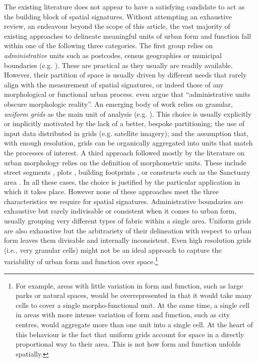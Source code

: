 The existing literature does not appear to have a satisfying candidate to act as
the building block of spatial signatures.
%
Without attempting an exhaustive review, an endeavour beyond the scope of this
article, the vast majority of existing approaches to delineate meaningful units
of urban form and function fall within one of the following three categories.
The first group relies on \textit{administrative} units such as postcodes,
census geographies or municipal boundaries (e.g. \citealp{taubenbock2020}).
%
These are practical as they usually are readily
available. However, their partition of space is usually driven by different
needs that rarely align with the measurement of spatial signatures, or indeed
those of any morphological or functional urban process.
\cite{taubenbock2019new} even argue that
``administrative units obscure morphologic reality''.
An emerging body of work relies on granular, \textit{uniform grids} as the main
unit of analysis (e.g. \citealp{jochem2020}). This choice is usually explicitly or implicitly motivated
by the lack of a better, bespoke partitioning; the use of input data distributed
in grids (e.g. satellite imagery); and the assumption that, with enough
resolution, grids can be organically aggregated into units that match the
processes of interest.
A third approach followed mostly by the literature on urban morphology relies on
the definition of morphometric units. These include street segments
\citep{araldi2019}, plots \citep{bobkova2019}, building footprints
\citep{schirmer2015}, or constructs such as the Sanctuary area
\citep{mehaffy2010urban,dibble2019origin}.
In all these cases, the
choice is justified by the particular application in which it takes place.
However none of these approaches meet the three characteristics we require for
spatial signatures.
%
Administrative boundaries are exhaustive but rarely indivisable or consistent
when it comes to urban form, usually grouping very different types of fabric
within a single area.
%
Uniform grids are also exhaustive but
the arbitrariety of their delineation with respect to urban form leaves
them divisable and internally inconsistent. Even high resolution
grids (i.e., very granular cells) might not be an ideal approach to capture
the variability of urban form and function over space.\footnote{For example,
areas with little variation in form and function, such as large parks or
natural spaces, would be overrepresented in that it would take many cells to
cover a single morpho-functional unit. At the same time, a single cell in
areas with more intense variation of form and function, such as city centres,
would aggregate more than one unit into a single cell. At the heart of this behaviour is the
fact that uniform grids account for space in a directly proportional way to
their area. This is not how form and function unfolds spatially.}
